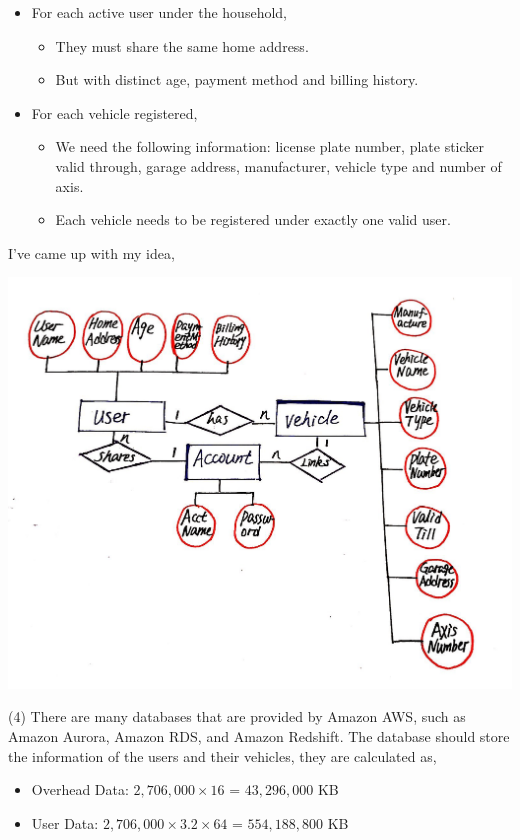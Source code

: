 \documentclass[11pt]{article}
\begin{document}
\begin{solution}
\begin{itemize}
\item For each
active user under the household,
\begin{itemize} 
\item They must share the same home address.
\item But with distinct age, payment method and billing history.
\end{itemize}
\pagebreak
\item For each vehicle
registered, 
\begin{itemize} 
\item We need the following information: license plate number, plate
sticker valid through, garage address, manufacturer, vehicle type and number
of axis. 
\item Each vehicle needs to be registered under exactly one valid user.
\end{itemize} 
\end{itemize}
I've came up with my idea,
\begin{center}
\includegraphics[width=15cm]{p1_2.jpg}
\end{center}
(4) There are many databases that are provided by Amazon AWS, such as Amazon Aurora, Amazon RDS, and Amazon Redshift. The database should store the information of the users and their vehicles, they are calculated as,
\begin{itemize} 
\item Overhead Data: $2,706,000 \times 16$ = $43,296,000$ KB
\item User Data: $2,706,000 \times 3.2 \times 64$ = $554,188,800$ KB

\end{itemize}
\end{solution}
\end{document}
